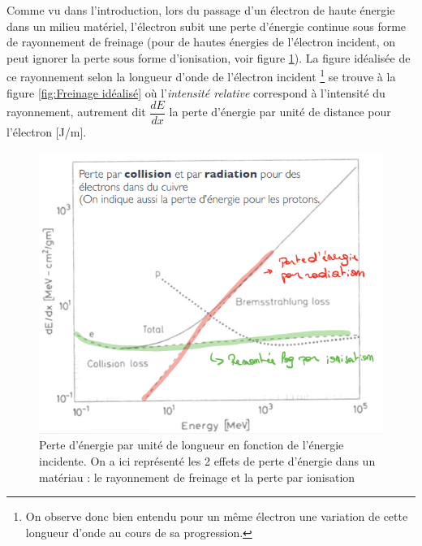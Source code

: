 Comme vu dans l'introduction, lors du passage d'un électron de haute énergie dans un milieu matériel, l'électron subit une perte d'énergie continue sous forme de rayonnement de freinage (pour de hautes énergies de l'électron incident, on peut ignorer la perte sous forme d'ionisation, voir figure \ref{fig:Résumé pertes}). La figure idéalisée de ce rayonnement selon la longueur d'onde de l'électron incident \footnote{On observe donc bien entendu pour un même électron une variation de cette longueur d'onde au cours de sa progression.} se trouve à la figure \ref{fig:Freinage idéalisé} où l'\textit{intensité relative} correspond à l'intensité du rayonnement, autrement dit $\dfrac{dE}{dx}$ la perte d'énergie par unité de distance pour l'électron [J/m].
\begin{figure}[tph]
    \centering
    \includegraphics[scale=0.8]{Images2/RésuméPerte.PNG}
    \caption{Perte d'énergie par unité de longueur en fonction de l'énergie incidente. On a ici représenté les 2 effets de perte d'énergie dans un matériau : le rayonnement de freinage et la perte par ionisation}
    \label{fig:Résumé pertes}
\end{figure}

